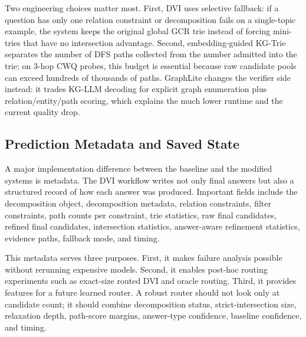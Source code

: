 \documentclass[10pt,twocolumn]{article}
\begin{document}
Two engineering choices matter most. First, DVI uses selective fallback: if a question has only one relation constraint or decomposition fails on a single-topic example, the system keeps the original global GCR trie instead of forcing mini-tries that have no intersection advantage. Second, embedding-guided KG-Trie separates the number of DFS paths collected from the number admitted into the trie; on 3-hop CWQ probes, this budget is essential because raw candidate pools can exceed hundreds of thousands of paths. GraphLite changes the verifier side instead: it trades KG-LLM decoding for explicit graph enumeration plus relation/entity/path scoring, which explains the much lower runtime and the current quality drop.


\subsection{Prediction Metadata and Saved State}
A major implementation difference between the baseline and the modified systems is metadata. The DVI workflow writes not only final answers but also a structured record of how each answer was produced. Important fields include the decomposition object, decomposition metadata, relation constraints, filter constraints, path counts per constraint, trie statistics, raw final candidates, refined final candidates, intersection statistics, answer-aware refinement statistics, evidence paths, fallback mode, and timing.

This metadata serves three purposes. First, it makes failure analysis possible without rerunning expensive models. Second, it enables post-hoc routing experiments such as exact-size routed DVI and oracle routing. Third, it provides features for a future learned router. A robust router should not look only at candidate count; it should combine decomposition status, strict-intersection size, relaxation depth, path-score margins, answer-type confidence, baseline confidence, and timing.
\end{document}
